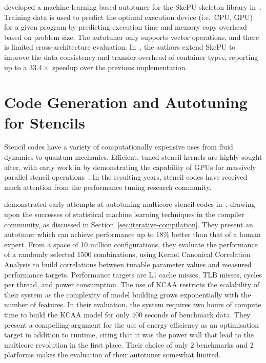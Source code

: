 \citeauthor{Dastgeer2011} developed a machine learning based autotuner
for the SkePU skeleton library in~\cite{Dastgeer2011}. Training data
is used to predict the optimal execution device (i.e.\ CPU, GPU) for a
given program by predicting execution time and memory copy overhead
based on problem size. The autotuner only supports vector operations,
and there is limited cross-architecture
evaluation. In~\cite{Dastgeer2015a}, the authors extend SkePU to
improve the data consistency and transfer overhead of container types,
reporting up to a $33.4\times$ speedup over the previous
implementation.


\section{Code Generation and Autotuning for Stencils}

Stencil codes have a variety of computationally expensive uses from
fluid dynamics to quantum mechanics. Efficient, tuned stencil kernels
are highly sought after, with early work in \citeyear{Bolz2003} by
\citeauthor{Bolz2003} demonstrating the capability of GPUs for
massively parallel stencil operations~\cite{Bolz2003}. In the
resulting years, stencil codes have received much attention from the
performance tuning research community.

\citeauthor{Ganapathi2009} demonstrated early attempts at autotuning
multicore stencil codes in~\cite{Ganapathi2009}, drawing upon the
successes of statistical machine learning techniques in the compiler
community, as discussed in
Section~\ref{sec:iterative-compilation}. They present an autotuner
which can achieve performance up to 18\% better than that of a human
expert. From a space of 10 million configurations, they evaluate the
performance of a randomly selected 1500 combinations, using Kernel
Canonical Correlation Analysis to build correlations between tunable
parameter values and measured performance targets. Performance targets
are L1 cache misses, TLB misses, cycles per thread, and power
consumption. The use of KCAA restricts the scalability of their system
as the complexity of model building grows exponentially with the
number of features. In their evaluation, the system requires two hours
of compute time to build the KCAA model for only 400 seconds of
benchmark data. They present a compelling argument for the use of
energy efficiency as an optimisation target in addition to runtime,
citing that it was the power wall that lead to the multicore
revolution in the first place. Their choice of only 2 benchmarks and 2
platforms makes the evaluation of their autotuner somewhat limited.

